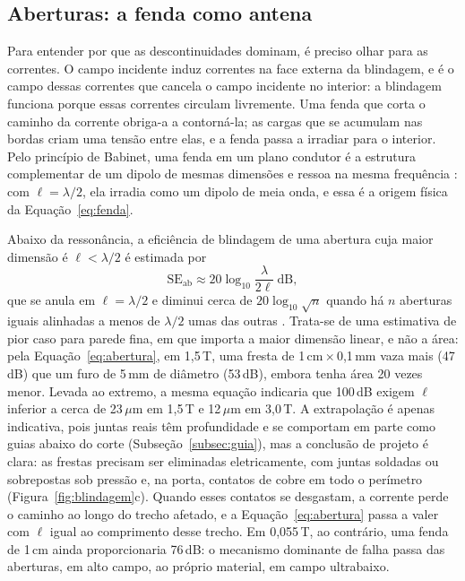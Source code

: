 \documentclass[portuguese]{sbcreviews-2025}%
\begin{document}
\subsection{Aberturas: a fenda como antena}
\label{subsec:aberturas}

Para entender por que as descontinuidades dominam, é preciso olhar para as correntes. O campo incidente induz correntes na face externa da blindagem, e é o campo dessas correntes que cancela o campo incidente no interior: a blindagem funciona porque essas correntes circulam livremente. Uma fenda que corta o caminho da corrente obriga-a a contorná-la; as cargas que se acumulam nas bordas criam uma tensão entre elas, e a fenda passa a irradiar para o interior. Pelo princípio de Babinet, uma fenda em um plano condutor é a estrutura complementar de um dipolo de mesmas dimensões e ressoa na mesma frequência \citep{balanis2016}: com $\ell = \lambda/2$, ela irradia como um dipolo de meia onda, e essa é a origem física da Equação~\eqref{eq:fenda}.

Abaixo da ressonância, a eficiência de blindagem de uma abertura cuja maior dimensão é $\ell < \lambda/2$ é estimada por \citep{ott2009}
\begin{equation}
\mathrm{SE}_{\mathrm{ab}} \approx 20\log_{10}\frac{\lambda}{2\ell}\ \mathrm{dB},
\label{eq:abertura}
\end{equation}
que se anula em $\ell = \lambda/2$ e diminui cerca de $20\log_{10}\sqrt{n}$ quando há $n$ aberturas iguais alinhadas a menos de $\lambda/2$ umas das outras \citep{ott2009}. Trata-se de uma estimativa de pior caso para parede fina, em que importa a maior dimensão linear, e não a área: pela Equação~\eqref{eq:abertura}, em 1,5\,T, uma fresta de 1\,cm\,$\times$\,0,1\,mm vaza mais (47\,dB) que um furo de 5\,mm de diâmetro (53\,dB), embora tenha área 20 vezes menor. Levada ao extremo, a mesma equação indicaria que 100\,dB exigem $\ell$ inferior a cerca de 23\,$\mu$m em 1,5\,T e 12\,$\mu$m em 3,0\,T. A extrapolação é apenas indicativa, pois juntas reais têm profundidade e se comportam em parte como guias abaixo do corte (Subseção~\ref{subsec:guia}), mas a conclusão de projeto é clara: as frestas precisam ser eliminadas eletricamente, com juntas soldadas ou sobrepostas sob pressão e, na porta, contatos de cobre em todo o perímetro (Figura~\ref{fig:blindagem}c). Quando esses contatos se desgastam, a corrente perde o caminho ao longo do trecho afetado, e a Equação~\eqref{eq:abertura} passa a valer com $\ell$ igual ao comprimento desse trecho. Em 0,055\,T, ao contrário, uma fenda de 1\,cm ainda proporcionaria 76\,dB: o mecanismo dominante de falha passa das aberturas, em alto campo, ao próprio material, em campo ultrabaixo.
\end{document}
